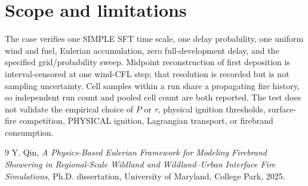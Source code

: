 \section{Scope and limitations}
The case verifies one SIMPLE SFT time scale, one delay probability, one uniform
wind and fuel, Eulerian accumulation, zero full-development delay, and the
specified grid/probability sweep. Midpoint reconstruction of first deposition is
interval-censored at one wind-CFL step; that resolution is recorded but is not
sampling uncertainty. Cell samples within a run share a propagating fire history,
so independent run count and pooled cell count are both reported. The test does
not validate the empirical choice of $P$ or $\tau$, physical ignition thresholds,
surface-fire competition, PHYSICAL ignition, Lagrangian transport, or firebrand
consumption.

\begin{thebibliography}{9}
Y. Qin, \emph{A Physics-Based Eulerian Framework for Modeling Firebrand
Showering in Regional-Scale Wildland and Wildland--Urban Interface Fire
Simulations}, Ph.D. dissertation, University of Maryland, College Park, 2025.
\end{thebibliography}
